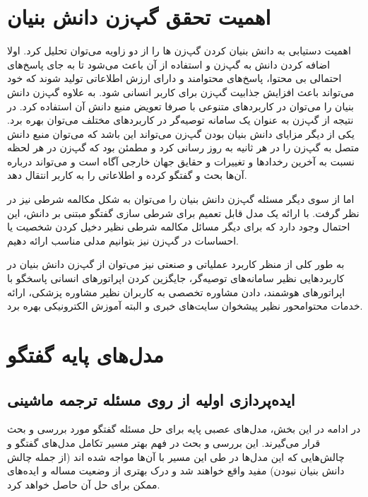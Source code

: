 \section{اهمیت تحقق گپ‌زن دانش بنیان} \label{chap1:knowledge_importance}

اهمیت دستیابی به دانش بنیان کردن گپ‌زن ها را از دو زاویه می‌توان تحلیل کرد. اولا اضافه کردن دانش به گپ‌زن و استفاده از آن باعث می‌شود تا به جای پاسخ‌های احتمالی بی محتوا، پاسخ‌های محتوامند و دارای ارزش اطلاعاتی تولید شوند که خود می‌تواند باعث افزایش جذابیت گپ‌زن برای کاربر انسانی شود. به علاوه گپ‌زن دانش بنیان را می‌توان در کاربردهای متنوعی با صرفا تعویض منبع دانش آن استفاده کرد. در نتیجه از گپ‌زن به عنوان یک سامانه توصیه‌گر در کاربردهای مختلف 
می‌توان بهره برد. یکی از دیگر مزایای دانش بنیان بودن گپ‌زن می‌تواند این باشد که می‌توان منبع دانش متصل به گپ‌زن را در هر ثانیه به روز رسانی کرد و مطمئن بود که گپ‌زن در هر لحظه نسبت به آخرین رخدادها و تغییرات و حقایق جهان خارجی آگاه است و می‌تواند درباره آن‌ها بحث و گفتگو کرده و اطلاعاتی را به کاربر انتقال دهد.

اما از سوی دیگر مسئله گپ‌زن دانش بنیان را می‌توان به شکل مکالمه شرطی نیز در نظر گرفت. با ارائه یک مدل قابل تعمیم برای شرطی سازی گفتگو مبتنی بر دانش، این احتمال وجود دارد که برای دیگر مسائل مکالمه شرطی نظیر دخیل کردن شخصیت یا احساسات در گپ‌زن نیز بتوانیم مدلی مناسب ارائه دهیم.

به طور  کلی از منظر کاربرد عملیاتی و صنعتی نیز می‌توان از گپ‌زن دانش بنیان در کاربرد‌هایی نظیر سامانه‌های توصیه‌گر،
 جایگزین کردن اپراتور‌های انسانی پاسخگو با اپراتور‌های هوشمند، دادن مشاوره تخصصی به کاربران نظیر مشاوره پزشکی، ارائه خدمات محتوامحور نظیر پیشخوان سایت‌های خبری و البته آموزش الکترونیکی بهره برد.  

\section{مدل‌های پایه گفتگو} \label{chap1:history}

\subsection{ایده‌پردازی اولیه از روی مسئله ترجمه ماشینی}

در ادامه در این بخش، مدل‌های  عصبی پایه برای حل مسئله گفتگو مورد بررسی و بحث قرار می‌گیرند. این بررسی و بحث در فهم بهتر مسیر تکامل مدل‌های گفتگو و چالش‌هایی که این مدل‌ها در طی این مسیر با آن‌ها مواجه شده اند (از جمله چالش دانش‌ بنیان نبودن) مفید واقع خواهند شد و درک بهتری از وضعیت مساله و ایده‌های ممکن برای حل آن حاصل خواهد کرد.

